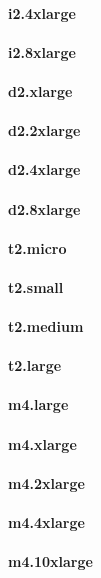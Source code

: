 \documentclass{acm_proc_article-sp}
\begin{document}
\paragraph{i2.4xlarge}
\paragraph{i2.8xlarge}
\paragraph{d2.xlarge}
\paragraph{d2.2xlarge}
\paragraph{d2.4xlarge}
\paragraph{d2.8xlarge}
\paragraph{t2.micro}
\paragraph{t2.small}
\paragraph{t2.medium}
\paragraph{t2.large}
\paragraph{m4.large}
\paragraph{m4.xlarge}
\paragraph{m4.2xlarge}
\paragraph{m4.4xlarge}
\paragraph{m4.10xlarge}
\end{document}
